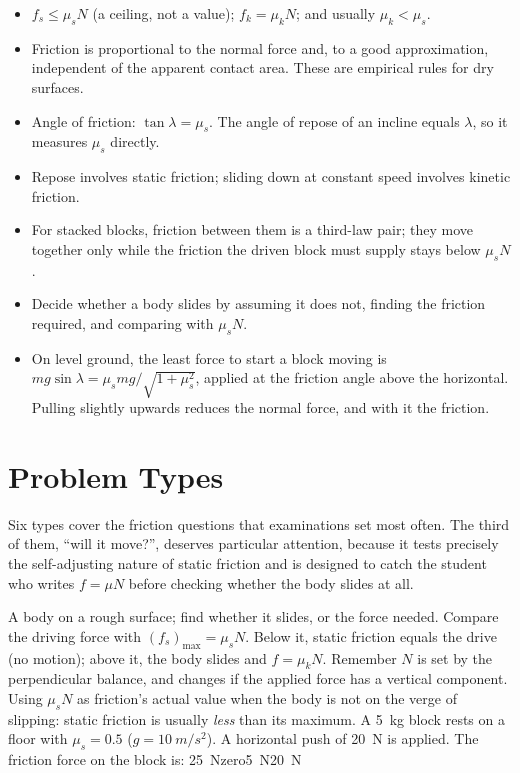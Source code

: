 \begin{itemize}
\item $f_s\le\mu_s N$ (a ceiling, not a value); $f_k=\mu_k N$; and usually $\mu_k<\mu_s$.
\item Friction is proportional to the normal force and, to a good approximation, independent of the apparent
      contact area. These are empirical rules for dry surfaces.
\item Angle of friction: $\tan\lambda=\mu_s$. The angle of repose of an incline equals $\lambda$, so it
      measures $\mu_s$ directly.
\item Repose involves static friction; sliding down at constant speed involves kinetic friction.
\item For stacked blocks, friction between them is a third-law pair; they move together only while the
      friction the driven block must supply stays below $\mu_s N$.
\item Decide whether a body slides by assuming it does not, finding the friction required, and comparing
      with $\mu_s N$.
\item On level ground, the least force to start a block moving is $mg\sin\lambda=\mu_s mg/\sqrt{1+\mu_s^2}$,
      applied at
      the friction angle above the horizontal. Pulling slightly upwards reduces the normal force, and with it
      the friction.
\end{itemize}

\section{Problem Types}\label{sec:types9}
Six types cover the friction questions that examinations set most often. The third of them, ``will it move?'', deserves
particular attention, because it tests precisely the self-adjusting nature of static friction and is
designed to catch the student who writes $f=\mu N$ before checking whether the body slides at all.

{A body on a rough surface; find whether it slides, or the force needed.}
{Compare the driving force with $(f_s)_{\max}=\mu_s N$. Below it, static friction equals the drive (no
motion); above it, the body slides and $f=\mu_k N$. Remember $N$ is set by the perpendicular balance,
and changes if the applied force has a vertical component.}
{Using $\mu_s N$ as friction's actual value when the body is not on the verge of slipping: static
friction is usually \emph{less} than its maximum.}
{A \SI{5}{kg} block rests on a floor with $\mu_s=0.5$ ($g=\SI{10}{m/s^2}$). A horizontal push of
\SI{20}{N} is applied. The friction force on the block is:}
{\SI{25}{N}}{zero}{\SI{5}{N}}{\SI{20}{N}}

